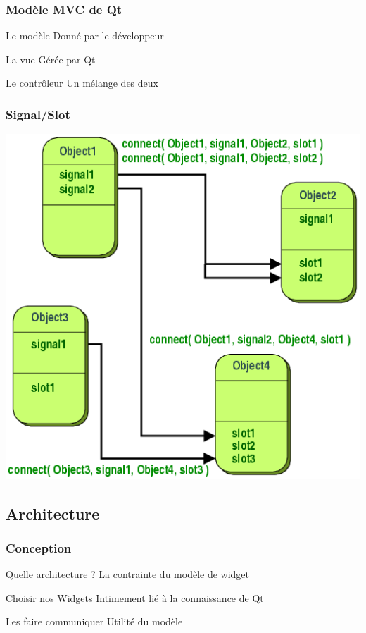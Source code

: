 \documentclass{beamer}
\begin{document}
        \begin{frame}
          \frametitle{Modèle MVC de Qt}
          \begin{block}{Le modèle}
            Donné par le développeur
          \end{block}
          \pause
          \begin{block}{La vue}
            Gérée par Qt
          \end{block}
          \pause
          \begin{block}{Le contrôleur}
            Un mélange des deux
          \end{block}
        \end{frame}

        \begin{frame}
          \frametitle{Signal/Slot}
          \center
          \includegraphics[scale=0.35]{images/abstract-connections.png}
        \end{frame}

        \subsection{Architecture}
        \begin{frame}
          \frametitle{Conception}
          \begin{block}{Quelle architecture ?}
            La contrainte du modèle de widget
          \end{block}
          \pause
          \begin{block}{Choisir nos Widgets}
            Intimement lié à la connaissance de Qt
          \end{block}
          \pause
          \begin{block}{Les faire communiquer}
            Utilité du modèle
          \end{block}
          \pause
        \end{frame}
        
\end{document}
